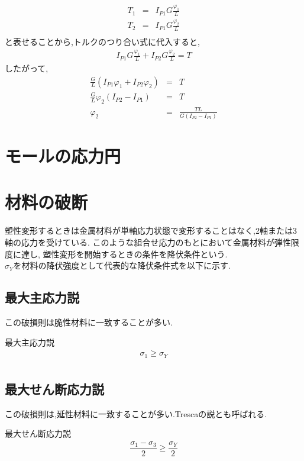 \documentclass[a4paper]{jsarticle}
\begin{document}
\begin{enumerate}[(1)]
          \begin{eqnarray*}
              T_1&=&I_{P1}G\frac{\varphi_1}{L}\\
              T_2&=&I_{P1}G\frac{\varphi_2}{L}\\
          \end{eqnarray*}
          と表せることから,トルクのつり合い式に代入すると,
          \begin{eqnarray*}
              I_{P1}G\frac{\varphi_1}{L}+I_{P2}G\frac{\varphi_2}{L}=T
          \end{eqnarray*}
          したがって,
          \begin{eqnarray*}
              \frac{G}{L}\left(I_{P1}\varphi_1+I_{P2}\varphi_2\right)&=&T\\
              \frac{G}{L}\varphi_2\left(I_{P2}-I_{P1}\right)&=&T\\
              \varphi_2&=&\frac{TL}{G\left(I_{P2}-I_{P1}\right)}
          \end{eqnarray*}
\end{enumerate}
\section{モールの応力円}
\section{材料の破断}
塑性変形するときは金属材料が単軸応力状態で変形することはなく,2軸または3軸の応力を受けている.
このような組合せ応力のもとにおいて金属材料が弾性限度に達し,
塑性変形を開始するときの条件を降伏条件という.\\
$\sigma_Y$を材料の降伏強度として代表的な降伏条件式を以下に示す.
\subsection{最大主応力説}
この破損則は脆性材料に一致することが多い.
\begin{itembox}[l]{最大主応力説}
    \begin{eqnarray*}
        \sigma_1\geq\sigma_Y\\
    \end{eqnarray*}
\end{itembox}
\subsection{最大せん断応力説}
この破損則は,延性材料に一致することが多い.Trescaの説とも呼ばれる.
\begin{itembox}[l]{最大せん断応力説}
    \begin{eqnarray*}
        \dfrac{\sigma_1-\sigma_3}{2}\geq\dfrac{\sigma_Y}{2}\\
    \end{eqnarray*}
\end{itembox}
\end{document}
